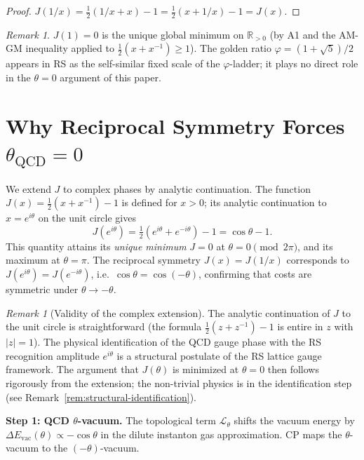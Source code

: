 \documentclass[12pt,a4paper]{article}
\theoremstyle{definition}
\theoremstyle{remark}
\newtheorem{remark}[theorem]{Remark}
\begin{document}
\begin{proof}
$J(1/x) = \frac{1}{2}(1/x + x) - 1 = \frac{1}{2}(x + 1/x) - 1 = J(x)$.
\end{proof}

\begin{remark}
$J(1) = 0$ is the unique global minimum on $\mathbb{R}_{>0}$
(by A1 and the AM-GM inequality applied to $\tfrac{1}{2}(x + x^{-1}) \geq 1$).
The golden ratio $\varphi = (1+\sqrt{5})/2$ appears in RS as the
self-similar fixed scale of the $\varphi$-ladder; it plays no direct
role in the $\theta = 0$ argument of this paper.
\end{remark}

\section{Why Reciprocal Symmetry Forces $\theta_{\mathrm{QCD}} = 0$}
\label{sec:proof}

We extend $J$ to complex phases by analytic continuation.  The
function $J(x) = \tfrac{1}{2}(x + x^{-1}) - 1$ is defined for
$x > 0$; its analytic continuation to $x = e^{i\theta}$ on the
unit circle gives
\begin{equation}
  \label{eq:J-phase}
  J(e^{i\theta}) = \tfrac{1}{2}(e^{i\theta} + e^{-i\theta}) - 1
  = \cos\theta - 1.
\end{equation}
This quantity attains its \emph{unique minimum} $J = 0$ at
$\theta = 0 \pmod{2\pi}$, and its maximum at $\theta = \pi$.
The reciprocal symmetry $J(x) = J(1/x)$ corresponds to
$J(e^{i\theta}) = J(e^{-i\theta})$, i.e.\ $\cos\theta = \cos(-\theta)$,
confirming that costs are symmetric under $\theta \to -\theta$.

\begin{remark}[Validity of the complex extension]
The analytic continuation of $J$ to the unit circle is
straightforward (the formula $\tfrac{1}{2}(z + z^{-1}) - 1$ is
entire in $z$ with $|z| = 1$).  The physical identification of the
QCD gauge phase with the RS recognition amplitude $e^{i\theta}$ is
a structural postulate of the RS lattice gauge framework.  The
argument that $J(\theta)$ is minimized at $\theta = 0$ then follows
rigorously from the extension; the non-trivial physics is in the
identification step (see Remark~\ref{rem:structural-identification}).
\end{remark}

\textbf{Step 1: QCD $\theta$-vacuum.}
The topological term $\mathcal{L}_\theta$ shifts the vacuum energy by
$\Delta E_{\mathrm{vac}}(\theta) \propto -\cos\theta$ in the dilute
instanton gas approximation.  CP maps the $\theta$-vacuum to the
$(-\theta)$-vacuum.
\end{document}
